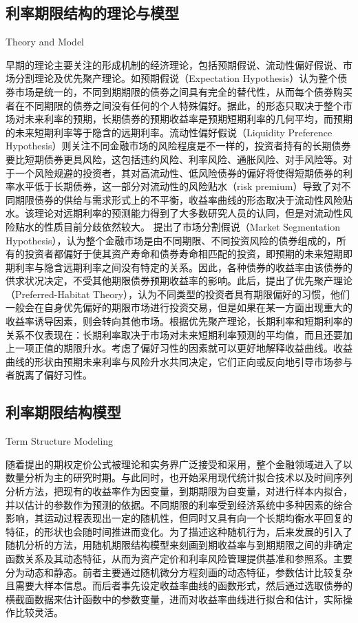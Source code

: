 \subsection{利率期限结构的理论与模型}{Theory and Model}\label{theory&model}

早期的\ts{}理论主要关注\ts 的形成机制的经济理论，包括预期假说、流动性偏好假说、市场分割理论及优先聚产理论。如预期假说（Expectation Hypothesis）认为整个债券市场是统一的，不同到期期限的债券之间具有完全的替代性，从而每个债券购买者在不同期限的债券之间没有任何的个人特殊偏好。据此，\ts 的形态只取决于整个市场对未来利率的预期，长期债券的预期收益率是预期短期利率的几何平均，而预期的未来短期利率等于\yc 隐含的远期利率。流动性偏好假说（Liquidity Preference Hypothesis）则关注不同金融市场的风险程度是不一样的，投资者持有的长期债券要比短期债券更具风险，这包括违约风险、利率风险、通胀风险、对手风险等。对于一个风险规避的投资者，其对高流动性、低风险债券的偏好将使得短期债券的利率水平低于长期债券，这一部分对流动性的风险贴水（risk premium）导致了对不同期限债券的供给与需求形式上的不平衡，收益率曲线的形态取决于流动性风险贴水。该理论对远期利率的预测能力得到了大多数研究人员的认同，但是对流动性风险贴水的性质目前分歧依然较大。 提出了市场分割假说（Market Segmentation Hypothesis），认为整个金融市场是由不同期限、不同投资风险的债券组成的，所有的投资者都偏好于使其资产寿命和债券寿命相匹配的投资，即预期的未来短期即期利率与隐含远期利率之间没有特定的关系。因此，各种债券的收益率由该债券的供求状况决定，不受其他期限债券预期收益率的影响。此后，提出了优先聚产理论（Preferred-Habitat Theory），认为不同类型的投资者具有期限偏好的习惯，他们一般会在自身优先偏好的期限市场进行投资交易，但是如果在某一方面出现重大的收益率诱导因素，则会转向其他市场。根据优先聚产理论，长期利率和短期利率的关系不仅表现在：长期利率取决于市场对未来短期利率预测的平均值，而且还要加上一项正值的期限升水。考虑了偏好习性的因素就可以更好地解释收益曲线。收益曲线的形状由预期未来利率与风险升水共同决定，它们正向或反向地引导市场参与者脱离了偏好习性。

\subsection{利率期限结构模型}{Term Structure Modeling}

随着提出的期权定价公式被理论和实务界广泛接受和采用，整个金融领域进入了以数量分析为主的研究时期。与此同时，\tsm 也开始采用现代统计拟合技术以及时间序列分析方法，把现有的收益率作为因变量，到期期限为自变量，对\yc 进行样本内拟合，并以估计的参数作为预测的依据。不同期限的利率受到经济系统中多种因素的综合影响，其运动过程表现出一定的随机性，但同时又具有向一个长期均衡水平回复的特征，\yc 的形状也会随时间推进而变化。为了描述这种随机行为，后来发展的\tsm 引入了随机分析的方法，用随机期限结构模型来刻画到期收益率与到期期限之间的非确定函数关系及其动态特征，从而为资产定价和利率风险管理提供基准和参照系。\tsm 主要分为动态\tsm 和静态\tsm{}。前者主要通过随机微分方程刻画\tsm 的动态特征，参数估计比较复杂且需要大样本信息。而后者事先设定收益率曲线的函数形式，然后通过选取债券的横截面数据来估计函数中的参数变量，进而对收益率曲线进行拟合和估计，实际操作比较灵活。

